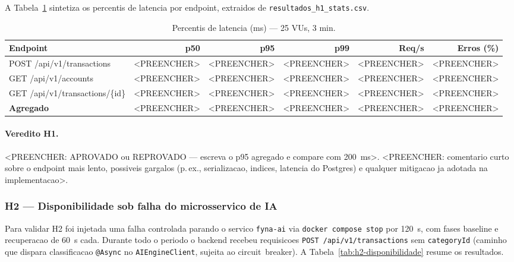 A Tabela~\ref{tab:h1-percentis} sintetiza os percentis de latencia por
endpoint, extraidos de \texttt{resultados\_h1\_stats.csv}.

\begin{table}[!htb]
  \centering
  \caption{Percentis de latencia (ms) — 25 VUs, 3 min.}
  \label{tab:h1-percentis}
  \begin{tabular}{lrrrrr}
    \hline
    \textbf{Endpoint} & \textbf{p50} & \textbf{p95} & \textbf{p99} & \textbf{Req/s} & \textbf{Erros (\%)} \\
    \hline
    POST /api/v1/transactions    & <PREENCHER> & <PREENCHER> & <PREENCHER> & <PREENCHER> & <PREENCHER> \\
    GET  /api/v1/accounts        & <PREENCHER> & <PREENCHER> & <PREENCHER> & <PREENCHER> & <PREENCHER> \\
    GET  /api/v1/transactions/\{id\} & <PREENCHER> & <PREENCHER> & <PREENCHER> & <PREENCHER> & <PREENCHER> \\
    \hline
    \textbf{Agregado}            & <PREENCHER> & <PREENCHER> & <PREENCHER> & <PREENCHER> & <PREENCHER> \\
    \hline
  \end{tabular}
\end{table}

\paragraph{Veredito H1.}
<PREENCHER: APROVADO ou REPROVADO — escreva o p95 agregado e compare com 200~ms>.
<PREENCHER: comentario curto sobre o endpoint mais lento, possiveis gargalos
(p.\,ex., serializacao, indices, latencia do Postgres) e qualquer mitigacao
ja adotada na implementacao>.

\subsubsection{H2 — Disponibilidade sob falha do microsservico de IA}
\label{sec:h2}

Para validar H2 foi injetada uma falha controlada parando o servico
\texttt{fyna-ai} via \texttt{docker compose stop} por 120~s, com fases
baseline e recuperacao de 60~s cada. Durante todo o periodo o backend
recebeu requisicoes \texttt{POST /api/v1/transactions} sem
\texttt{categoryId} (caminho que dispara classificacao \texttt{@Async} no
\texttt{AIEngineClient}, sujeita ao circuit~breaker). A
Tabela~\ref{tab:h2-disponibilidade} resume os resultados.

